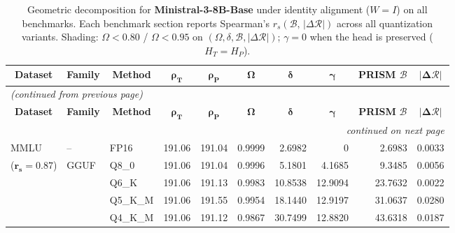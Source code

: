 \begingroup
\small
\setlength{\tabcolsep}{4pt}
\renewcommand{\arraystretch}{1.05}
\setlength{\LTcapwidth}{\textwidth}
\begin{longtable}{ll l rrrrrrr}
\caption{Geometric decomposition for \textbf{Ministral-3-8B-Base} under identity alignment ($W{=}I$) on all benchmarks. Each benchmark section reports Spearman's $r_s(\mathcal{B},\,|\Delta\mathcal{R}|)$ across all quantization variants. Shading: \colorbox{red!35}{$\Omega{<}0.80$} / \colorbox{red!18}{$\Omega{<}0.95$} on $(\Omega,\delta,\mathcal{B},|\Delta\mathcal{R}|)$; \colorbox{cyan!12}{$\gamma{=}0$} when the head is preserved ($H_T{=}H_P$).}\label{tab:mistral_decomposition_all_bound}\\
\toprule
\multicolumn{1}{c}{\textbf{Dataset}} & \multicolumn{1}{c}{\textbf{Family}} & \multicolumn{1}{c}{\textbf{Method}} & \multicolumn{1}{c}{$\boldsymbol{\rho_T}$} & \multicolumn{1}{c}{$\boldsymbol{\rho_P}$} & \multicolumn{1}{c}{$\boldsymbol{\Omega}$} & \multicolumn{1}{c}{$\boldsymbol{\delta}$} & \multicolumn{1}{c}{$\boldsymbol{\gamma}$} & \multicolumn{1}{c}{\textbf{PRISM} $\boldsymbol{\mathcal{B}}$} & \multicolumn{1}{c}{$\boldsymbol{|\Delta\mathcal{R}|}$} \\
\midrule
\endfirsthead
\multicolumn{10}{l}{\small\itshape (continued from previous page)}\\
\toprule
\multicolumn{1}{c}{\textbf{Dataset}} & \multicolumn{1}{c}{\textbf{Family}} & \multicolumn{1}{c}{\textbf{Method}} & \multicolumn{1}{c}{$\boldsymbol{\rho_T}$} & \multicolumn{1}{c}{$\boldsymbol{\rho_P}$} & \multicolumn{1}{c}{$\boldsymbol{\Omega}$} & \multicolumn{1}{c}{$\boldsymbol{\delta}$} & \multicolumn{1}{c}{$\boldsymbol{\gamma}$} & \multicolumn{1}{c}{\textbf{PRISM} $\boldsymbol{\mathcal{B}}$} & \multicolumn{1}{c}{$\boldsymbol{|\Delta\mathcal{R}|}$} \\
\midrule
\endhead
\midrule
\multicolumn{10}{r}{\small\itshape continued on next page}\\
\endfoot
\bottomrule
\endlastfoot
MMLU & -- & FP16 & 191.06 & 191.04 & 0.9999 & 2.6982 & \cellcolor{cyan!12} $0$ & 2.6983 & 0.0033 \\
{\small ($\mathbf{r_s{=}0.87}$)} & GGUF & Q8\_0 & 191.06 & 191.04 & 0.9996 & 5.1801 & 4.1685 & 9.3485 & 0.0056 \\
 &  & Q6\_K & 191.06 & 191.13 & 0.9983 & 10.8538 & 12.9094 & 23.7632 & 0.0022 \\
 &  & Q5\_K\_M & 191.06 & 191.55 & 0.9954 & 18.1440 & 12.9197 & 31.0637 & 0.0280 \\
 &  & Q4\_K\_M & 191.06 & 191.12 & 0.9867 & 30.7499 & 12.8820 & 43.6318 & 0.0187 \\

\end{longtable}
